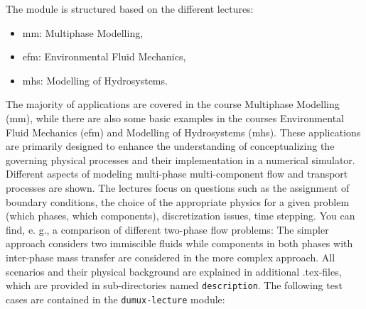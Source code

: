 The module is structured based on the different lectures:
\begin{itemize}
\item mm: Multiphase Modelling,
\item efm: Environmental Fluid Mechanics,
\item mhs: Modelling of Hydrosystems.
\end{itemize}
The majority of applications are covered in the course Multiphase Modelling (mm),
while there are also some basic examples in the
courses Environmental Fluid Mechanics (efm) and Modelling of Hydrosystems (mhs).
These applications are primarily designed to enhance the understanding of conceptualizing the
governing physical processes and their implementation in a numerical simulator.
Different aspects of modeling multi-phase multi-component flow and transport processes are shown.
The lectures focus on questions such as the assignment of boundary conditions, the choice of the
appropriate physics for a given problem (which phases, which components), discretization issues,
time stepping. You can find, e. g., a comparison of different two-phase flow problems: The
simpler approach considers two immiscible fluids while components in both phases with inter-phase
mass transfer are considered in the more complex approach.
All scenarios and their physical background are explained in additional .tex-files,
which are provided in sub-directories named \texttt{description}. The following test cases are
contained in the \texttt{dumux-lecture} module:
